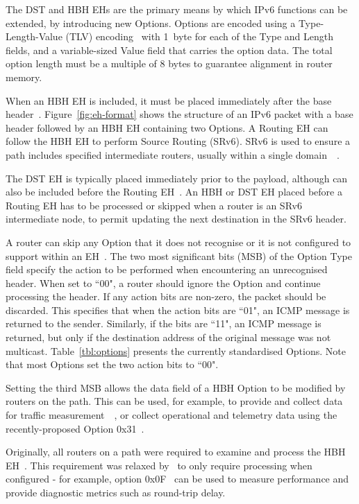 \documentclass[conference]{IEEEtran}
\begin{document}
The DST and HBH EHs are the primary means by which IPv6 functions
can be extended, by introducing new Options. 
Options are encoded using a Type-Length-Value (TLV)
encoding~\cite{rfc8200} with 1~byte for each of the Type and Length fields, and
a variable-sized Value field that carries the option data. The total option
length must be a multiple of 8 bytes to guarantee alignment in router memory.

When an HBH EH is included, it must be placed immediately after the base
header~\cite{rfc8200}.  Figure~\ref{fig:eh-format} shows the structure of an
IPv6 packet with a base header followed by an HBH EH containing two
Options.  A Routing EH can follow the HBH EH to perform Source
Routing (SRv6). SRv6 is used to ensure a path includes specified intermediate
routers, usually within a single domain~\cite{srv6}~\cite{srperf}. 

The DST EH
is typically placed immediately prior to the payload, although can also be included before the Routing EH~\cite{rfc8200}. An HBH or
DST EH placed before a Routing EH has to be processed or skipped when a router is an
SRv6 intermediate node, to permit updating the next destination in the SRv6 header. 


A router can skip any Option that it does not recognise or it is not configured to
support within an EH~\cite{rfc8200}.  The two most significant bits (MSB) of the Option Type field specify
the action to be performed when encountering an unrecognised header.  When set to ``00", a router should
ignore the Option and continue processing the header.  If any action bits are
non-zero, the packet should be discarded.  This specifies that when the action bits are ``01", an
ICMP message is returned to the sender. Similarly, if the bits are ``11",
an ICMP message is returned, but only if the destination address of the original message was not multicast.
Table~\ref{tbl:options} presents the currently standardised Options.  Note that
most Options set the two action bits to ``00".

Setting the third MSB allows the data field of a HBH Option to be modified by
routers on the path. This can be used, for
example, to provide and collect data for traffic measurement~\cite{rfc9268}~\cite{rfc9343}, or collect operational and telemetry
data using the recently-proposed Option 0x31~\cite{ietf-ippm-ioam-ipv6-options-12}.  

Originally, all routers on a
path were required to examine and process the HBH EH~\cite{rfc2460}. This
requirement was relaxed by~\cite{rfc8200} to only require processing when
configured - for example, option 0x0F~\cite{rfc8250} can be used to measure
performance and provide diagnostic metrics such as round-trip delay. 
\end{document}
